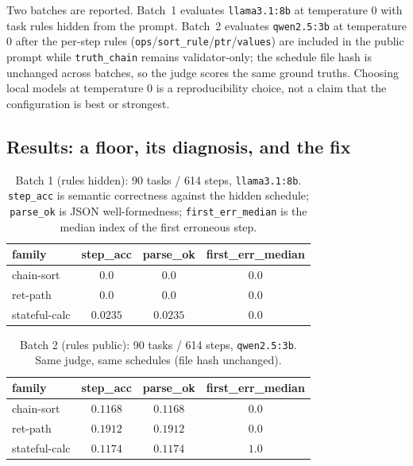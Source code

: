\documentclass[11pt]{article}
\begin{document}
Two batches are reported. Batch~1 evaluates \texttt{llama3.1:8b} at
temperature $0$ with task rules hidden from the prompt. Batch~2 evaluates
\texttt{qwen2.5:3b} at temperature $0$ after the per-step rules
(\texttt{ops}/\texttt{sort\_rule}/\texttt{ptr}/\texttt{values}) are included
in the public prompt while \texttt{truth\_chain} remains validator-only; the
schedule file hash is unchanged across batches, so the judge scores the same
ground truths. Choosing local models at temperature $0$ is a
reproducibility choice, not a claim that the configuration is best or
strongest.

\subsection{Results: a floor, its diagnosis, and the fix}

\begin{table}[t]
\centering
\caption{Batch 1 (rules hidden): 90 tasks / 614 steps, \texttt{llama3.1:8b}.
\texttt{step\_acc} is semantic correctness against the hidden schedule;
\texttt{parse\_ok} is JSON well-formedness; \texttt{first\_err\_median} is the
median index of the first erroneous step.}
\label{tab:etl}
\begin{tabular}{lccc}
\toprule
family & step\_acc & parse\_ok & first\_err\_median \\
\midrule
chain-sort    & $0.0$    & $0.0$    & $0.0$ \\
ret-path      & $0.0$    & $0.0$    & $0.0$ \\
stateful-calc & $0.0235$ & $0.0235$ & $0.0$ \\
\bottomrule
\end{tabular}
\end{table}

\begin{table}[t]
\centering
\caption{Batch 2 (rules public): 90 tasks / 614 steps, \texttt{qwen2.5:3b}.
Same judge, same schedules (file hash unchanged).}
\label{tab:etl-v2}
\begin{tabular}{lccc}
\toprule
family & step\_acc & parse\_ok & first\_err\_median \\
\midrule
chain-sort    & $0.1168$ & $0.1168$ & $0.0$ \\
ret-path      & $0.1912$ & $0.1912$ & $0.0$ \\
stateful-calc & $0.1174$ & $0.1174$ & $1.0$ \\
\bottomrule
\end{tabular}
\end{table}
\end{document}
